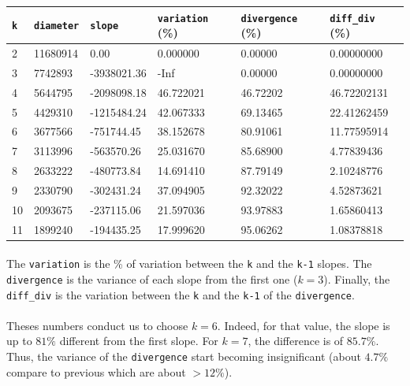 \begin{tabular}{|l|l|l|l|l|l|}
\hline \texttt{k} & \texttt{diameter} & \texttt{slope} & \texttt{variation} (\%) & \texttt{divergence} (\%) & \texttt{diff\_div} (\%) \\ 
\hline 2 & 11680914 & 0.00 & 0.000000 & 0.00000 & 0.00000000 \\ 
\hline 3 & 7742893 & -3938021.36 & -Inf & 0.00000 & 0.00000000 \\ 
\hline 4 & 5644795 & -2098098.18 & 46.722021 & 46.72202 & 46.72202131 \\ 
\hline 5 & 4429310 & -1215484.24 & 42.067333 & 69.13465 & 22.41262459 \\ 
\hline 6 & 3677566 & -751744.45 & 38.152678 & 80.91061 & 11.77595914 \\ 
\hline 7 & 3113996 & -563570.26 & 25.031670 & 85.68900 & 4.77839436 \\ 
\hline 8 & 2633222 & -480773.84 & 14.691410 & 87.79149 & 2.10248776 \\ 
\hline 9 & 2330790 & -302431.24 & 37.094905 & 92.32022 & 4.52873621 \\ 
\hline 10 & 2093675 & -237115.06 & 21.597036 & 93.97883 & 1.65860413 \\ 
\hline 11 & 1899240 & -194435.25 & 17.999620 & 95.06262 & 1.08378818 \\ 
\hline 
\end{tabular} 

\paragraph{}The \texttt{variation} is the \% of variation between the \texttt{k} and the \texttt{k-1} slopes. The \texttt{divergence} is the variance of each slope from the first one ($k=3$). Finally, the \texttt{diff\_div} is the variation between the \texttt{k} and the \texttt{k-1} of the \texttt{divergence}.

\paragraph{}Theses numbers conduct us to choose $k=6$. Indeed, for that value, the slope is up to $81\%$ different from the first slope. For $k=7$, the difference is of $85.7\%$. Thus, the variance of the \texttt{divergence} start becoming insignificant (about $4.7\%$ compare to previous which are about $>12\%$).

